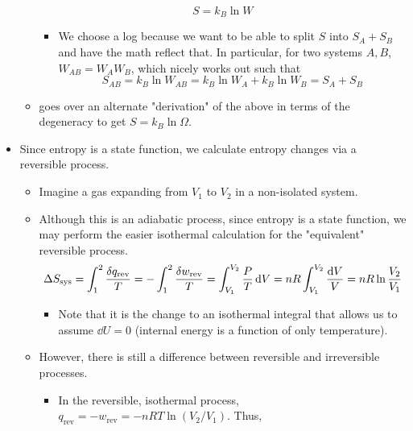 \documentclass[../notes.tex]{subfiles}
\begin{document}
\begin{itemize}
\begin{itemize}
\begin{equation*}
            S = k_B\ln W
        \end{equation*}
        \begin{itemize}
            \item We choose a log because we want to be able to split $S$ into $S_A+S_B$ and have the math reflect that. In particular, for two systems $A,B$, $W_{AB}=W_AW_B$, which nicely works out such that
            \begin{equation*}
                S_{AB} = k_B\ln W_{AB} = k_B\ln W_A+k_B\ln W_B = S_A+S_B
            \end{equation*}
        \end{itemize}
        \item \textcite{bib:McQuarrieSimon} goes over an alternate "derivation" of the above in terms of the degeneracy to get $S=k_B\ln\Omega$.
    \end{itemize}
    \item {}Since entropy is a state function, we calculate entropy changes via a reversible process.
    \begin{itemize}
        \item Imagine a gas expanding from $V_1$ to $V_2$ in a non-isolated system.
        \item Although this is an adiabatic process, since entropy is a state function, we may perform the easier isothermal calculation for the "equivalent" reversible process.
        \begin{equation*}
            \Delta S_\text{sys} = \int_1^2\frac{\var{q_\text{rev}}}{T}
            = -\int_1^2\frac{\var{w_\text{rev}}}{T}
            = \int_{V_1}^{V_2}\frac{P}{T}\dd{V}
            = nR\int_{V_1}^{V_2}\frac{\dd{V}}{V}
            = nR\ln\frac{V_2}{V_1}
        \end{equation*}
        \begin{itemize}
            \item Note that it is the change to an isothermal integral that allows us to assume $\dd{U}=0$ (internal energy is a function of only temperature).
        \end{itemize}
        \item However, there is still a difference between reversible and irreversible processes.
        \begin{itemize}
            \item In the reversible, isothermal process, $q_\text{rev}=-w_\text{rev}=-nRT\ln(V_2/V_1)$. Thus,
            \begin{equation*}

\end{equation*}
\end{itemize}
\end{itemize}
\end{itemize}
\end{document}
